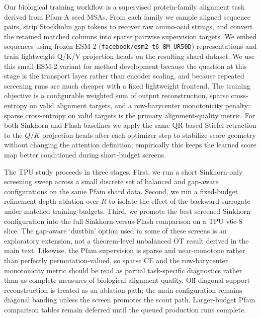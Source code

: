 \documentclass{article}
\begin{document}
Our biological training workflow is a supervised protein-family alignment task derived from Pfam-A seed MSAs. From each family we sample aligned sequence pairs, strip Stockholm gap tokens to recover raw amino-acid strings, and convert the retained matched columns into sparse pairwise supervision targets. We embed sequences using frozen ESM-2 (\nolinkurl{facebook/esm2_t6_8M_UR50D}) representations and train lightweight Q/K/V projection heads on the resulting shard dataset. We use this small ESM-2 variant for method development because the question at this stage is the transport layer rather than encoder scaling, and because repeated screening runs are much cheaper with a fixed lightweight frontend. The training objective is a configurable weighted sum of output reconstruction, sparse cross-entropy on valid alignment targets, and a row-barycenter monotonicity penalty; sparse cross-entropy on valid targets is the primary alignment-quality metric. For both Sinkhorn and Flash baselines we apply the same QR-based Stiefel retraction to the $Q/K$ projection heads after each optimizer step to stabilize score geometry without changing the attention definition; empirically this keeps the learned score map better conditioned during short-budget screens.

The TPU study proceeds in three stages. First, we run a short Sinkhorn-only screening sweep across a small discrete set of balanced and gap-aware configurations on the same Pfam shard data. Second, we run a fixed-budget refinement-depth ablation over $R$ to isolate the effect of the backward surrogate under matched training budgets. Third, we promote the best screened Sinkhorn configuration into the full Sinkhorn-versus-Flash comparison on a TPU v6e-8 slice. The gap-aware `dustbin' option used in some of these screens is an exploratory extension, not a theorem-level unbalanced OT result derived in the main text. Likewise, the Pfam supervision is sparse and near-monotone rather than perfectly permutation-valued, so sparse CE and the row-barycenter monotonicity metric should be read as partial task-specific diagnostics rather than as complete measures of biological alignment quality. Off-diagonal support reconstruction is treated as an ablation path; the main configuration remains diagonal banding unless the screen promotes the scout path. Larger-budget Pfam comparison tables remain deferred until the queued production runs complete.
\end{document}
